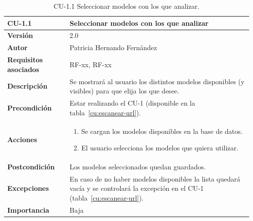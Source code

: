 \begin{table}[p]
	\centering
	\begin{tabularx}{\linewidth}{ p{} p{} }
		\toprule
		\textbf{CU-1.1}    & \textbf{Seleccionar modelos con los que analizar}\\
		\toprule
		\textbf{Versión}              & 2.0    \\
		\textbf{Autor}                & Patricia Hernando Fernández \\
		\textbf{Requisitos asociados} & RF-xx, RF-xx \\
		\textbf{Descripción}          & Se mostrará al usuario los distintos modelos disponibles (y visibles) para que elija los que desee. \\
		\textbf{Precondición}         & Estar realizando el CU-1 (disponible en la tabla~\ref{cu:escanear-url}). \\
		\textbf{Acciones}             &
		\begin{enumerate}
			\def\labelenumi{\arabic{enumi}.}
			\tightlist
			\item Se cargan los modelos disponibles en la base de datos.
			\item El usuario selecciona los modelos que quiera utilizar.
		\end{enumerate}\\
		\textbf{Postcondición}        & Los modelos seleccionados quedan guardados. \\
		\textbf{Excepciones}          & En caso de no haber modelos disponibles la lista quedará vacía y se controlará la excepción en el CU-1 (tabla~\ref{cu:escanear-url}). \\
		\textbf{Importancia}          & Baja \\
		\bottomrule
	\end{tabularx}
	\caption{CU-1.1 Seleccionar modelos con los que analizar.}
	\label{cu:seleccionar-modelos-ml}
\end{table}

